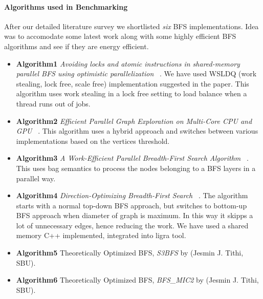 \paragraph{Algorithms used in Benchmarking}
After our detailed literature survey we shortlisted \emph{six} BFS
implementations.  Idea was to accomodate some latest work along with some
highly efficient BFS algorithms and see if they are energy efficient.
\begin{itemize}[leftmargin=*]
\item \textbf{Algorithm1}
\emph{Avoiding locks and atomic instructions in shared-memory parallel
BFS using optimistic parallelization} ~\cite{WSLDQ-BFS}.  We have used
WSLDQ (work stealing, lock free, scale free) implementation suggested
in the paper.  This algorithm uses work stealing in a lock free
setting to load balance when a thread runs out of jobs.
\item \textbf{Algorithm2}
\emph{Efficient Parallel Graph Exploration on Multi-Core CPU and GPU}
~\cite{STANFORD-BFS}. This algorithm uses a hybrid approach and
switches between various implementations based on the vertices
threshold.
\item \textbf{Algorithm3}
\emph{A Work-Efficient Parallel Breadth-First Search Algorithm}
~\cite{MIT-BFS}.  This uses bag semantics to process the nodes
belonging to a BFS layers in a parallel way.
\item \textbf{Algorithm4}
\emph{Direction-Optimizing Breadth-First Search} ~\cite{LIGRA-BFS}.
The algorithm starts with a normal top-down BFS approach, but switches to
bottom-up BFS approach when diameter of graph is maximum.  In this way
it skipps a lot of unnecessary edges, hence reducing the work.
We have used a shared memory C++ implemented, integrated into ligra tool.
\item \textbf{Algorithm5}
Theoretically Optimized BFS, \emph{S3BFS} by (Jesmin J. Tithi, SBU).
\item \textbf{Algorithm6}
Theoretically Optimized BFS, \emph{BFS\_MIC2} by (Jesmin J. Tithi, SBU).
\end{itemize}

